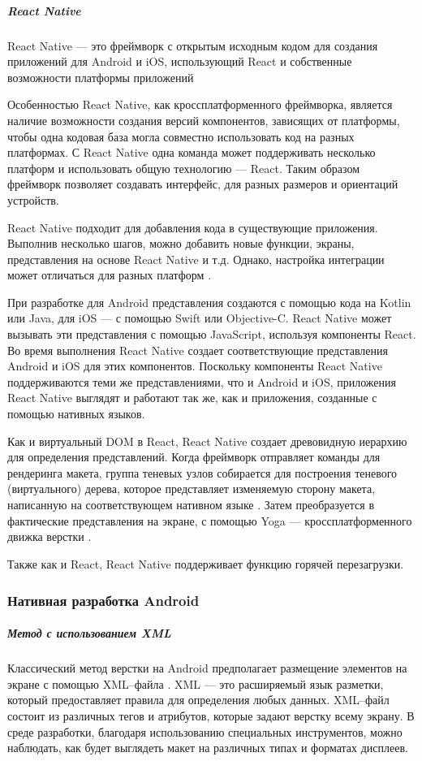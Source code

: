 \subparagraph{React Native} 
\subparagraph{}  

React Native --- это фреймворк с открытым исходным кодом для создания приложений для Android и iOS, использующий React и собственные возможности платформы приложений \cite{react-components}

Особенностью React Native, как кроссплатформенного фреймворка, является наличие возможности создания версий компонентов, зависящих от платформы, чтобы одна кодовая база могла совместно использовать код на разных платформах. С React Native одна команда может поддерживать несколько платформ и использовать общую технологию — React.
Таким образом фреймворк позволяет создавать интерфейс, для разных размеров и ориентаций устройств.

React Native подходит для добавления кода в существующие приложения. 
Выполнив несколько шагов, можно добавить новые функции, экраны, представления на основе React Native и т.д.
Однако, настройка интеграции может отличаться для разных платформ \cite{react-native-integr}. 

При разработке для Android представления создаются с помощью кода на Kotlin или Java, для iOS --- с помощью Swift или Objective-C. 
React Native может вызывать эти представления с помощью JavaScript, используя компоненты React. 
Во время выполнения React Native создает соответствующие представления Android и iOS для этих компонентов. 
Поскольку компоненты React Native поддерживаются теми же представлениями, что и Android и iOS, приложения React Native выглядят и работают так же, как и приложения, созданные с помощью нативных языков. 

Как и виртуальный DOM в React, React Native создает древовидную иерархию для определения представлений.
Когда фреймворк отправляет команды для рендеринга макета, группа теневых узлов собирается для построения теневого (виртуального) дерева, которое представляет изменяемую сторону макета, написанную на соответствующем нативном языке \cite{react-native-render}. 
Затем преобразуется в фактические представления на экране, с помощью Yoga --- кроссплатформенного движка верстки \cite{yoga}.

Также как и React, React Native поддерживает функцию горячей перезагрузки.
\subparagraph{}  
\subsubsection{Нативная разработка Android} 

\subparagraph{Метод с использованием XML} 
\subparagraph{}  
Классический метод верстки на Android предполагает размещение элементов на экране с помощью XML--файла \cite{xml-android}.
XML --- это расширяемый язык разметки, который предоставляет правила для определения любых данных.
XML--файл состоит из различных тегов и атрибутов, которые задают верстку всему экрану. 
В среде разработки, благодаря использованию специальных инструментов, можно наблюдать, как будет выглядеть макет на различных типах и форматах дисплеев.

